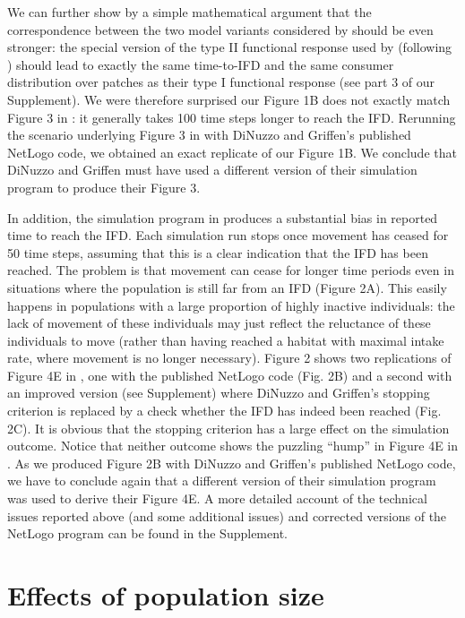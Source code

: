 	We can further show by a simple mathematical argument that the correspondence between the two model variants considered by \citeauthor{dinuzzo2020} should be even stronger: the special version of the type II functional response used by \citeauthor{dinuzzo2020} (following \citeauthor{abrams2000}) should lead to exactly the same time-to-IFD and the same consumer distribution over patches as their type I functional response (see part 3 of our Supplement).
	We were therefore surprised our Figure 1B does not exactly match Figure 3 in \citep{dinuzzo2020}: it generally takes 100 time steps longer to reach the IFD.
	Rerunning the scenario underlying Figure 3 in \citep{dinuzzo2020} with DiNuzzo and Griffen's published NetLogo code, we obtained an exact replicate of our Figure 1B.
	We conclude that DiNuzzo and Griffen must have used a different version of their simulation program to produce their Figure 3.

	In addition, the simulation program in \citep{dinuzzo2020} produces a substantial bias in reported time to reach the IFD.
	Each simulation run stops once movement has ceased for 50 time steps, assuming that this is a clear indication that the IFD has been reached.
	The problem is that movement can cease for longer time periods even in situations where the population is still far from an IFD (Figure 2A).
	This easily happens in populations with a large proportion of highly inactive individuals: the lack of movement of these individuals may just reflect the reluctance of these individuals to move (rather than having reached a habitat with maximal intake rate, where movement is no longer necessary).
	Figure 2 shows two replications of Figure 4E in \citep{dinuzzo2020}, one with the published NetLogo code (Fig. 2B) and a second with an improved version (see Supplement) where DiNuzzo and Griffen's stopping criterion is replaced by a check whether the IFD has indeed been reached (Fig. 2C).
	It is obvious that the stopping criterion has a large effect on the simulation outcome.
	Notice that neither outcome shows the puzzling ``hump'' in Figure 4E in \citep{dinuzzo2020}.
	As we produced Figure 2B with DiNuzzo and Griffen's published NetLogo code, we have to conclude again that a different version of their simulation program was used to derive their Figure 4E.
	A more detailed account of the technical issues reported above (and some additional issues) and corrected versions of the NetLogo program can be found in the Supplement.

	\section*{Effects of population size}
	
